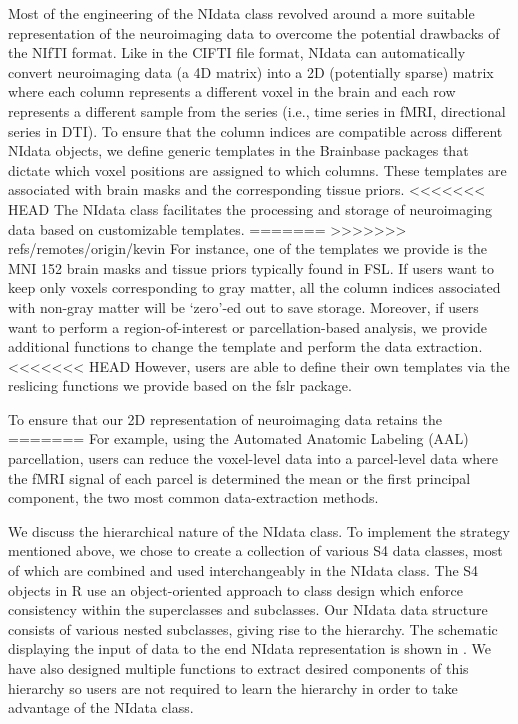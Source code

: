 \documentclass{nature}
\begin{document}
Most of the engineering of the NIdata class revolved around a more suitable
representation of the neuroimaging data to overcome the potential
drawbacks of the NIfTI format. Like in the CIFTI file
format\cite{Glasser2013The},
NIdata can automatically convert neuroimaging data (a 4D matrix)
into a 2D (potentially sparse) matrix where each
column represents a different voxel
in the brain and each row represents
a different sample from the series (i.e., time series in fMRI, directional
series in DTI). To ensure that the column indices are
compatible across different NIdata objects, we define generic templates in the
Brainbase packages that dictate which voxel positions are assigned to which
columns.
These templates are associated with brain masks and the corresponding tissue
priors. 
<<<<<<< HEAD
The NIdata class facilitates the processing
and storage of neuroimaging data based on customizable
templates.
=======
>>>>>>> refs/remotes/origin/kevin
For instance, one of the templates we provide is the MNI 152 brain masks and
tissue priors typically found in FSL.
If users want to keep only voxels corresponding to gray matter, all the column
indices associated with non-gray matter will be `zero'-ed out to save storage.
Moreover, if users want to perform a
region-of-interest or parcellation-based analysis, we provide
additional functions to change the template and perform the data extraction.
<<<<<<< HEAD
However, users are able to define their own templates via the reslicing functions
we provide based on the fslr package. %

To ensure that our 2D representation of neuroimaging data retains the
=======
For example, using the Automated Anatomic Labeling (AAL) parcellation\cite{tzourio2002automated},
users can reduce the voxel-level data into a parcel-level data where the fMRI
signal of each parcel is determined the mean or the first principal component, the two most
common data-extraction methods.

We discuss the hierarchical nature of the NIdata class. To implement the strategy mentioned
above, we chose to create a collection of various S4 data classes, most of which are combined and used
interchangeably in the NIdata class. The S4 objects in R use an object-oriented approach to class design
which enforce consistency within the superclasses and subclasses. Our NIdata data structure consists of
various nested subclasses, giving rise to the hierarchy. 
The
schematic displaying the input of data to the end NIdata representation
is shown in . We have also designed multiple functions to extract
desired components of this hierarchy so users are not required to learn the hierarchy in order to
take advantage of the NIdata class.
\end{document}
